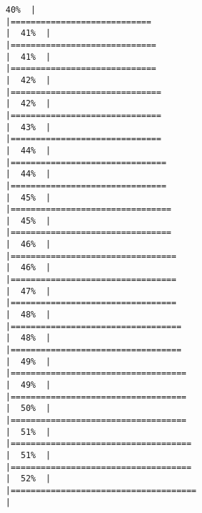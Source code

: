 \documentclass[
]{article}
\begin{document}
\begin{verbatim}
40%  |                                                                              |============================                                          |  41%  |                                                                              |=============================                                         |  41%  |                                                                              |=============================                                         |  42%  |                                                                              |==============================                                        |  42%  |                                                                              |==============================                                        |  43%  |                                                                              |==============================                                        |  44%  |                                                                              |===============================                                       |  44%  |                                                                              |===============================                                       |  45%  |                                                                              |================================                                      |  45%  |                                                                              |================================                                      |  46%  |                                                                              |=================================                                     |  46%  |                                                                              |=================================                                     |  47%  |                                                                              |=================================                                     |  48%  |                                                                              |==================================                                    |  48%  |                                                                              |==================================                                    |  49%  |                                                                              |===================================                                   |  49%  |                                                                              |===================================                                   |  50%  |                                                                              |===================================                                   |  51%  |                                                                              |====================================                                  |  51%  |                                                                              |====================================                                  |  52%  |                                                                              |=====================================                                 |  
\end{verbatim}
\end{document}
